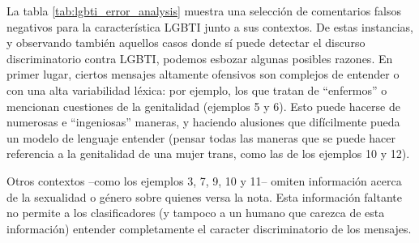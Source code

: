 La tabla \ref{tab:lgbti_error_analysis} muestra una selección de comentarios falsos negativos para la característica LGBTI junto a sus contextos. De estas instancias, y observando también aquellos casos donde sí puede detectar el discurso discriminatorio contra LGBTI, podemos esbozar algunas posibles razones. En primer lugar, ciertos mensajes altamente ofensivos son complejos de entender o con una alta variabilidad léxica: por ejemplo, los que tratan de ``enfermos'' o mencionan cuestiones de la genitalidad (ejemplos 5 y 6). Esto puede hacerse de numerosas e ``ingeniosas'' maneras, y haciendo alusiones que difícilmente pueda un modelo de lenguaje entender (pensar todas las maneras que se puede hacer referencia a la genitalidad de una mujer trans, como las de los ejemplos 10 y 12).

Otros contextos --como los ejemplos 3, 7, 9, 10 y 11-- omiten información acerca de la sexualidad o género sobre quienes versa la nota. Esta información faltante no permite a los clasificadores (y tampoco a un humano que carezca de esta información) entender completamente el caracter discriminatorio de los mensajes.



